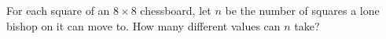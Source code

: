 For each square of an $8\times8$ chessboard, let $n$ be the number of squares a lone bishop on it can move to. How many different values can $n$ take?
